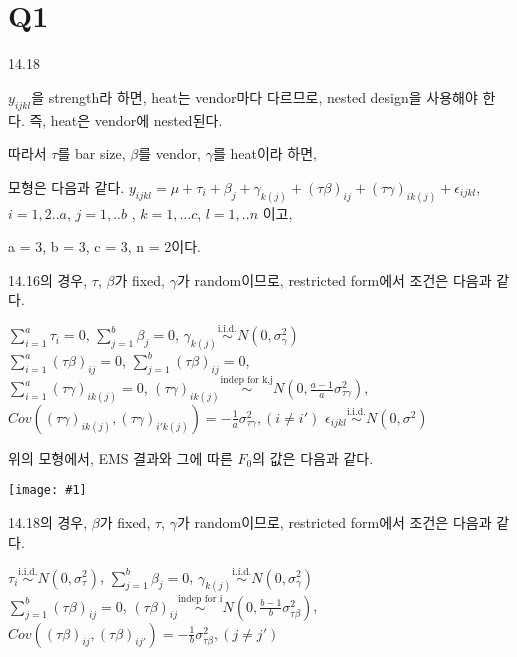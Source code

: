 \documentclass{article}
\newlength{\textundbildtextheight}
\newcommand{\printimage}[1]{
\vfill
\begin{center}
\texttt{[image: \#1]}
\end{center}
\vfill
}
\begin{document}
\pagestyle{fancy}


\section{Q1} 

14.18

$y_{ijkl}$을 strength라 하면, heat는 vendor마다 다르므로, nested design을 사용해야 한다. 즉, heat은 vendor에 nested된다.

따라서 $\tau$를 bar size, $\beta$를 vendor, $\gamma$를 heat이라 하면,

모형은 다음과 같다. 
$y_{ijkl} = \mu + \tau_i + \beta_j + \gamma_{k(j)} + (\tau \beta)_{ij} +  (\tau \gamma)_{ik(j)} +  \epsilon_{ijkl}$, $i = 1,2.. a$, $j = 1, .. b$ ,  $k = 1, ...c $, $l = 1, .. n$ 이고,

a = 3, b = 3, c = 3, n = 2이다.

14.16의 경우, $\tau$, $\beta$가 fixed, $\gamma$가 random이므로, restricted form에서 조건은 다음과 같다.

$\sum_{i=1}^a \tau_i = 0 $, $\sum_{j=1}^b \beta_j = 0 $,  $\gamma_{k(j)} \overset{\text{i.i.d.}}{\sim} N(0, \sigma_{\gamma}^2)$ \\

$\sum_{i=1}^a (\tau \beta)_{ij} = 0$, $\sum_{j=1}^b (\tau \beta)_{ij} = 0$,\\

$\sum_{i=1}^a (\tau \gamma)_{ik(j)} = 0$,   
$(\tau \gamma)_{ik(j)} \overset{\text{indep for k,j}}{\sim} N(0, \frac{a-1}{a}\sigma_{\tau \gamma}^2)$,
$Cov( (\tau \gamma)_{ik(j)}, (\tau \gamma)_{i'k(j)}) = -\frac{1}{a} \sigma_{\tau \gamma}^2, (i \neq i')$
$\epsilon_{ijkl}  \overset{\text{i.i.d.}}{\sim} N(0, \sigma^2)$

위의 모형에서, EMS 결과와 그에 따른 $F_0$의 값은 다음과 같다.


\printimage{hw5_1_14-16_EMS.jpg}



14.18의 경우, $\beta$가 fixed, $\tau$, $\gamma$가 random이므로, restricted form에서 조건은 다음과 같다.

$\tau_{i} \overset{\text{i.i.d.}}{\sim} N(0, \sigma_{\tau}^2)$, $\sum_{j=1}^b \beta_j = 0 $,  $\gamma_{k(j)} \overset{\text{i.i.d.}}{\sim} N(0, \sigma_{\gamma}^2)$ \\

$\sum_{j=1}^b (\tau \beta)_{ij} = 0$, $(\tau \beta)_{ij} \overset{\text{indep for i}}{\sim} N(0, \frac{b-1}{b}\sigma_{\tau \beta}^2)$,
$Cov( (\tau \beta)_{ij}, (\tau \beta)_{ij'}) = -\frac{1}{b} \sigma_{\tau \beta}^2, (j \neq j')$\\
\end{document}

